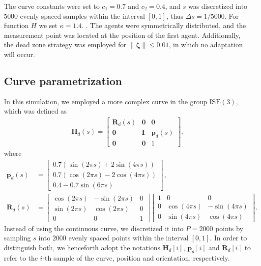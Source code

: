 The curve constants were set to $c_1 = 0.7$ and $c_2 = 0.4$, and $s$ was discretized into $5000$ evenly spaced samples within the interval $[0, 1]$, thus $\Delta s=1\slash5000$. For function $H$ we set $\kappa=1.4$. . The agents were symmetrically distributed, and the measurement point was located at the position of the first agent. Additionally, the dead zone strategy \citep{ioannou2012robust} was employed for $\|\boldsymbol{\zeta}\| \le 0.01$, in which no adaptation will occur.

\subsection{Curve parametrization}
In this simulation, we employed a more complex curve in the group $\text{ISE}(3)$, which was defined as
\begin{align}
    \mathbf{H}_d(s) = \begin{bmatrix}
        \mathbf{R}_d(s) & \mathbf{0} & \mathbf{0}\\
        \mathbf{0} & \mathbf{I} & \mathbf{p}_d(s)\\
        \mathbf{0} & \mathbf{0} & 1
    \end{bmatrix},\label{eq:parametriceq-simulation}
\end{align}
where
\begin{align}
    \mathbf{p}_d(s) &= \begin{bmatrix}
        0.7(\sin(2\pi s) + 2\sin(4\pi s))\\
        0.7(\cos(2\pi s) - 2\cos(4\pi s))\\
        0.4 - 0.7\sin(6\pi s)
    \end{bmatrix},\\
    \mathbf{R}_d(s) &= \begin{bmatrix}
        \cos(2\pi s) & -\sin(2\pi s) & 0\\
        \sin(2\pi s) & \cos(2\pi s) & 0\\
        0 & 0 & 1
    \end{bmatrix}\begin{bmatrix}
        1 & 0 & 0\\
        0 & \cos(4\pi s) & -\sin(4\pi s)\\
        0 & \sin(4\pi s) & \cos(4\pi s)
    \end{bmatrix}.
\end{align}
Instead of using the continuous curve, we discretized it into $P=\num{2000}$ points by sampling $s$ into $\num{2000}$ evenly spaced points within the interval $[0, 1]$. In order to distinguish both, we henceforth adopt the notations $\mathbf{H}_d[i]$, $\mathbf{p}_d[i]$ and $\mathbf{R}_d[i]$ to refer to the $i$-th sample of the curve, position and orientation, respectively.


